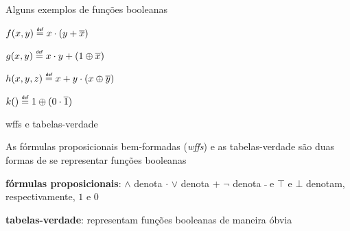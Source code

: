 \expandafter\documentclass\expandafter[table, usenames, svgnames, dvipsnames,14pt, \classopts]{beamer}
\newcommand\defeq{\mathrel{\overset{\makebox[0pt]{\mbox{\normalfont\tiny\sffamily def}}}{=}}}
\begin{document}
\begin{frame}{Alguns exemplos de funções booleanas}

    \begin{outline}[enumerate]
        \1 $f(x,y) \defeq x \cdot (y + \overline{x})$
            
        \vspace{1em}
            
        \1 $g(x,y) \defeq x \cdot y + (1 \oplus \overline{x})$

        \vspace{1em}

        \1 $h(x,y,z) \defeq x + y \cdot (x \oplus \overline{y})$

        \vspace{1em}

        \1 $k() \defeq 1 \oplus (0 \cdot \overline{1})$
    \end{outline}        

\end{frame}

\begin{frame}{wffs e tabelas-verdade}

    As fórmulas proposicionais bem-formadas (\textit{wffs}) e as tabelas-verdade são duas formas de se representar funções booleanas

    \begin{outline}
        \1 \textbf{fórmulas proposicionais}:
            \2[-] $\land$ denota $\cdot$
            \2[-] $\lor$ denota $+$
            \2[-] $\lnot$ denota $\bar{~}$
            \2[-] e $\top$ e $\bot$ denotam, respectivamente, $1$ e $0$
        
        \vspace{1em}
        
        \1 \textbf{tabelas-verdade}: representam funções booleanas de maneira óbvia
    \end{outline}        
            
\end{frame}
\end{document}
